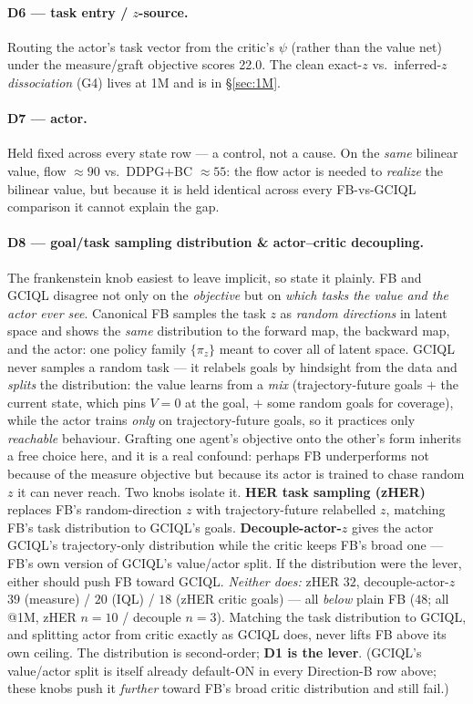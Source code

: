 \documentclass[11pt]{article}
\newcommand{\B}[1]{\textbf{#1}}
\newcommand{\bad}[1]{\textcolor{red!70!black}{#1}}
\begin{document}
\paragraph{D6 --- task entry / $z$-source.} Routing the actor's task vector from
the critic's $\psi$ (rather than the value net) under the measure/graft objective
scores \bad{22.0}. The clean exact-$z$ vs.\ inferred-$z$ \emph{dissociation}
(G4) lives at 1M and is in \S\ref{sec:1M}.

\paragraph{D7 --- actor.}
\label{sec:actor}
Held fixed across every state row --- a control, not a cause. On the \emph{same}
bilinear value, flow $\approx90$ vs.\ DDPG+BC $\approx55$: the flow actor is needed
to \emph{realize} the bilinear value, but because it is held identical across every
FB-vs-GCIQL comparison it cannot explain the gap.

\paragraph{D8 --- goal/task sampling distribution \& actor--critic decoupling.}
The frankenstein knob easiest to leave implicit, so state it plainly. FB and GCIQL
disagree not only on the \emph{objective} but on \emph{which tasks the value and the
actor ever see}. Canonical FB samples the task $z$ as \emph{random directions} in
latent space and shows the \emph{same} distribution to the forward map, the backward
map, and the actor: one policy family $\{\pi_z\}$ meant to cover all of latent space.
GCIQL never samples a random task --- it relabels goals by hindsight from the data
and \emph{splits} the distribution: the value learns from a \emph{mix}
(trajectory-future goals $+$ the current state, which pins $V{=}0$ at the goal, $+$
some random goals for coverage), while the actor trains \emph{only} on
trajectory-future goals, so it practices only \emph{reachable} behaviour. Grafting
one agent's objective onto the other's form inherits a free choice here, and it is a
real confound: perhaps FB underperforms not because of the measure objective but
because its actor is trained to chase random $z$ it can never reach. Two knobs
isolate it. \B{HER task sampling (zHER)} replaces FB's random-direction $z$ with
trajectory-future relabelled $z$, matching FB's task distribution to GCIQL's goals.
\B{Decouple-actor-$z$} gives the actor GCIQL's trajectory-only distribution while the
critic keeps FB's broad one --- FB's own version of GCIQL's value/actor split. If the
distribution were the lever, either should push FB toward GCIQL. \emph{Neither does:}
zHER $32$, decouple-actor-$z$ $39$ (measure) / $20$ (IQL) / $18$ (zHER critic goals)
--- all \emph{below} plain FB ($48$; all @1M, zHER $n{=}10$ / decouple $n{=}3$). Matching the task distribution to
GCIQL, and splitting actor from critic exactly as GCIQL does, never lifts FB above
its own ceiling. The distribution is second-order; \B{D1 is the lever}. (GCIQL's
value/actor split is itself already default-ON in every Direction-B row above; these
knobs push it \emph{further} toward FB's broad critic distribution and still fail.)
\end{document}
